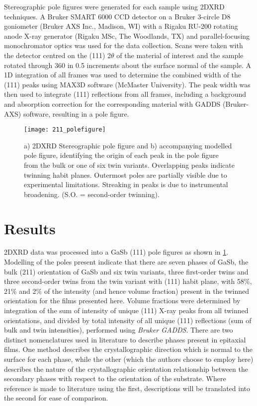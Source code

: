 Stereographic pole figures were generated for each sample using 2DXRD techniques. A Bruker SMART 6000 CCD detector on a Bruker 3-circle D8 goniometer (Bruker AXS Inc., Madison, WI) with a Rigaku RU-200 rotating anode X-ray generator (Rigaku MSc, The Woodlands, TX) and parallel-focusing monochromator optics was used for the data collection. Scans were taken with the detector centred on the (111) 2$\theta$ of the material of interest and the sample rotated through 360\degree{} in 0.5\degree{} increments about the surface normal of the sample. A 1D integration of all frames was used to determine the combined width of the (111) peaks using MAX3D software (McMaster University)\cite{Britten2007}. The peak width was then used to integrate (111) reflections from all frames, including a background and absorption correction for the corresponding material with GADDS (Bruker-AXS) software, resulting in a pole figure.
\begin{figure}
    \centering
\texttt{[image: 211\_polefigure]}
\caption[Measured and simulated pole figure of thin film on 211 silicon]{\label{fig:211_polefigure}a) 2DXRD Stereographic pole figure and b) accompanying modelled pole figure, identifying the origin of each peak in the pole figure from the bulk or one of six twin variants. Overlapping peaks indicate twinning habit planes. Outermost poles are partially visible due to experimental limitations. Streaking in peaks is due to instrumental broadening. (S.O. = second-order twinning).}
\end{figure}

\section{Results}
2DXRD data was processed into a GaSb (111) pole figures as shown in \cref{fig:211_polefigure}. Modelling of the poles present indicate that there are seven phases of GaSb, the bulk (211) orientation of GaSb and six twin variants, three first-order twins and three second-order twins from the twin variant with (111) habit plane, with 58\%, 21\% and 2\% of the intensity (and hence volume fraction) present in the twinned orientation for the films presented here. Volume fractions were determined by integration of the sum of intensity of unique (111) X-ray peaks from all twinned orientations, and divided by total intensity of all unique (111) reflections (sum of bulk and twin intensities), performed using \textit{Bruker GADDS}. There are two distinct nomenclatures used in literature to describe phases present in epitaxial films.\cite{Kim2010a,Lange1991,Johnson2011,DeLyon1995} One method describes the crystallographic direction which is normal to the surface for each phase, while the other (which the authors choose to employ here) describes the nature of the crystallographic orientation relationship between the secondary phases with respect to the orientation of the substrate. Where reference is made to literature using the first, descriptions will be translated into the second for ease of comparison.

